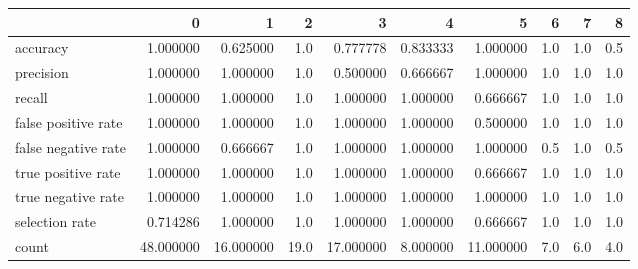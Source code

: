 \begin{tabular}{lrrrrrrrrr}
\toprule
{} &          0 &          1 &     2 &          3 &         4 &          5 &    6 &    7 &    8 \\
\midrule
accuracy            &   1.000000 &   0.625000 &   1.0 &   0.777778 &  0.833333 &   1.000000 &  1.0 &  1.0 &  0.5 \\
precision           &   1.000000 &   1.000000 &   1.0 &   0.500000 &  0.666667 &   1.000000 &  1.0 &  1.0 &  1.0 \\
recall              &   1.000000 &   1.000000 &   1.0 &   1.000000 &  1.000000 &   0.666667 &  1.0 &  1.0 &  1.0 \\
false positive rate &   1.000000 &   1.000000 &   1.0 &   1.000000 &  1.000000 &   0.500000 &  1.0 &  1.0 &  1.0 \\
false negative rate &   1.000000 &   0.666667 &   1.0 &   1.000000 &  1.000000 &   1.000000 &  0.5 &  1.0 &  0.5 \\
true positive rate  &   1.000000 &   1.000000 &   1.0 &   1.000000 &  1.000000 &   0.666667 &  1.0 &  1.0 &  1.0 \\
true negative rate  &   1.000000 &   1.000000 &   1.0 &   1.000000 &  1.000000 &   1.000000 &  1.0 &  1.0 &  1.0 \\
selection rate      &   0.714286 &   1.000000 &   1.0 &   1.000000 &  1.000000 &   0.666667 &  1.0 &  1.0 &  1.0 \\
count               &  48.000000 &  16.000000 &  19.0 &  17.000000 &  8.000000 &  11.000000 &  7.0 &  6.0 &  4.0 \\
\bottomrule
\end{tabular}
